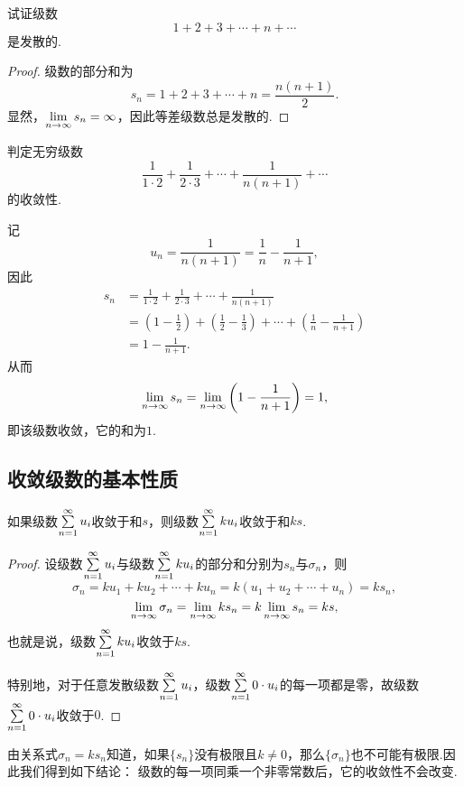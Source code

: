\begin{example}\label{example:无穷级数.等差级数的收敛性}
试证级数\[
1+2+3+\dotsb+n+\dotsb
\]是发散的.
\begin{proof}
级数的部分和为\[
s_n = 1+2+3+\dotsb+n = \frac{n(n+1)}{2}.
\]显然，\(\lim\limits_{n\to\infty} s_n=\infty\)，因此{\color{red}等差级数总是发散的.}
\end{proof}
\end{example}

\begin{example}
判定无穷级数\[
\frac{1}{1\cdot2}+\frac{1}{2\cdot3}+\dotsb+\frac{1}{n(n+1)}+\dotsb
\]的收敛性.
\begin{solution}
记\[
u_n = \frac{1}{n(n+1)} = \frac{1}{n}-\frac{1}{n+1},
\]因此\begin{align*}
s_n &= \frac{1}{1\cdot2}+\frac{1}{2\cdot3}+\dotsb+\frac{1}{n(n+1)} \\
&= \left(1-\frac{1}{2}\right)+\left(\frac{1}{2}-\frac{1}{3}\right)+\dotsb+\left(\frac{1}{n}-\frac{1}{n+1}\right) \\
&= 1-\frac{1}{n+1}.
\end{align*}从而\[
\lim\limits_{n\to\infty} s_n = \lim\limits_{n\to\infty} \left(1-\frac{1}{n+1}\right) = 1,
\]即该级数收敛，它的和为\(1\).
\end{solution}
\end{example}

\subsection{收敛级数的基本性质}
\begin{property}\label{theorem:无穷级数.收敛级数性质1}
如果级数\(\sum\limits_{n=1}^{\infty} u_i\)收敛于和\(s\)，则级数\(\sum\limits_{n=1}^{\infty} k u_i\)收敛于和\(ks\).
\begin{proof}
设级数\(\sum\limits_{n=1}^{\infty} u_i\)与级数\(\sum\limits_{n=1}^{\infty} k u_i\)的部分和分别为\(s_n\)与\(\sigma_n\)，则\[
\sigma_n = k u_1 + k u_2 + \dotsb + k u_n = k(u_1 + u_2 + \dotsb + u_n) = k s_n,
\]\[
\lim\limits_{n\to\infty}\sigma_n = \lim\limits_{n\to\infty} k s_n = k \lim\limits_{n\to\infty} s_n = ks,
\]也就是说，级数\(\sum\limits_{n=1}^{\infty} k u_i\)收敛于\(ks\).

特别地，对于任意发散级数\(\sum\limits_{n=1}^{\infty} u_i\)，级数\(\sum\limits_{n=1}^{\infty} 0 \cdot u_i\)的每一项都是零，故级数\(\sum\limits_{n=1}^{\infty} 0 \cdot u_i\)收敛于\(0\).
\end{proof}
\end{property}

由关系式\(\sigma_n = k s_n\)知道，如果\(\{s_n\}\)没有极限且\(k\neq0\)，那么\(\{\sigma_n\}\)也不可能有极限.因此我们得到如下结论：
{\color{red}级数的每一项同乘一个非零常数后，它的收敛性不会改变.}

